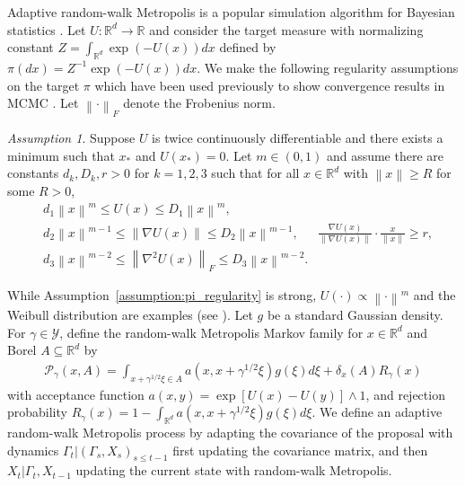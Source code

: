 \documentclass[12pt]{article}
\theoremstyle{plain}
\theoremstyle{remark}
\newtheorem{assumption}[theorem]{Assumption}
\newcommand{\norm}[1]{\left\lVert#1\right\rVert}
\newcommand{\R}{\mathbb{R}}
\renewcommand{\P}{\mathcal{P}}
\newcommand{\Y}{\mathcal{Y}}
\begin{document}
Adaptive random-walk Metropolis is a popular simulation algorithm for Bayesian statistics \citep{haario:2001}.
Let $U : \R^d \to \R$ and consider the target measure with normalizing constant $Z = \int_{\R^d} \exp(-U(x)) dx$ defined by $\pi(dx) = Z^{-1} \exp(-U(x)) dx$.
We make the following regularity assumptions on the target $\pi$ which have been used previously to show convergence results in MCMC \citep{douc:etal:2004}.
Let $\norm{\cdot}_F$ denote the Frobenius norm.

\begin{assumption}
\label{assumption:pi_regularity}
Suppose $U$ is twice continuously differentiable and there exists a minimum such that $x_*$ and $U(x_*) = 0$.
Let $m \in (0, 1)$ and assume there are constants $d_k, D_k, r > 0$ for $k = 1, 2, 3$ such that for all $x \in \R^d$ with $\norm{x} \ge R$ for some $R > 0$,
\begin{align}
&d_1 \norm{x}^m \le U(x) \le D_1 \norm{x}^m,
\label{assumption:pi_bound}
\\
&d_2 \norm{x}^{m-1} \le \norm{\nabla U(x)} \le D_2 \norm{x}^{m-1},
& \frac{\nabla U(x)}{ \norm{ \nabla U(x) } } \cdot \frac{x}{\norm{x}}
\ge r,
\label{assumption:grad_pi}
\\
&d_3 \norm{x}^{m-2} \le \norm{\nabla^2 U(x)}_F \le D_3 \norm{x}^{m-2}.
\label{assumption:hess_pi_bound}
\end{align}
\end{assumption}

While Assumption~\eqref{assumption:pi_regularity} is strong, $U(\cdot) \propto \norm{\cdot}^{m}$ and the Weibull distribution are examples (see \citep{fort:moulines:2000}).
Let $g$ be a standard Gaussian density.
For $\gamma \in \Y$, define the random-walk Metropolis Markov family for $x \in \R^d$ and Borel $A \subseteq \R^d$ by
\begin{align}
\P_\gamma(x, A)
= \int_{x + \gamma^{1/2} \xi \in A} a(x, x + \gamma^{1/2} \xi) g(\xi) d\xi
+ \delta_x(A) R_\gamma(x)
\label{eq:rwm}
\end{align}
with acceptance function $a(x, y) = \exp[ U(x) - U(y) ] \wedge 1$, and rejection probability $R_\gamma(x) = 1 - \int_{\R^d} a(x, x + \gamma^{1/2} \xi) g(\xi) d\xi$.
We define an adaptive random-walk Metropolis process by adapting the covariance of the proposal \citep{haario:2001} with dynamics
$\Gamma_t | (\Gamma_{s}, X_{s})_{s \le t-1}$ first updating the covariance matrix, and then $X_t | \Gamma_t, X_{t-1}$ updating the current state with random-walk Metropolis.
\end{document}
